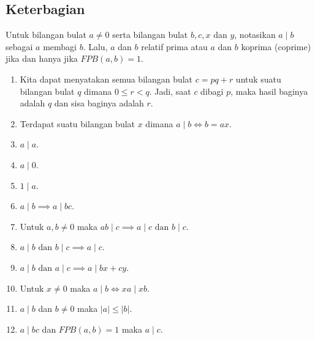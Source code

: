 \subsection{Keterbagian}
    Untuk bilangan bulat $a \neq 0$ serta bilangan bulat $b,c,x$ dan $y$, notasikan $a \mid b$ sebagai $a$ membagi $b$. Lalu, $a$ dan $b$ relatif prima atau $a$ dan $b$ koprima (coprime) jika dan hanya jika $FPB(a,b)=1$.
    \begin{enumerate}
        \item Kita dapat menyatakan semua bilangan bulat $c = pq+r$ untuk suatu bilangan bulat $q$ dimana $0 \le r < q$. Jadi, saat $c$ dibagi $p$, maka hasil baginya adalah $q$ dan sisa baginya adalah $r$.
        \item Terdapat suatu bilangan bulat $x$ dimana $a \mid b \iff b=ax$.
        \item $a \mid a$.
        \item $a \mid 0$.
        \item $1 \mid a$.
        \item $a \mid b \implies a \mid bc$.
        \item Untuk $a,b \neq 0$ maka $ab \mid c \implies a \mid c \text{ dan } b \mid c$.
        \item $a \mid b \text{ dan } b \mid c \implies a \mid c$.
        \item $a \mid b \text{ dan } a \mid c \implies a \mid bx + cy$.
        \item Untuk $x \neq 0$ maka $a \mid b \iff xa \mid xb$.
        \item $a \mid b$ dan $b \neq 0$ maka $|a| \le |b|$.
        \item $a \mid bc$ dan $FPB(a,b)=1$ maka $a\mid c$.
    \end{enumerate}


    